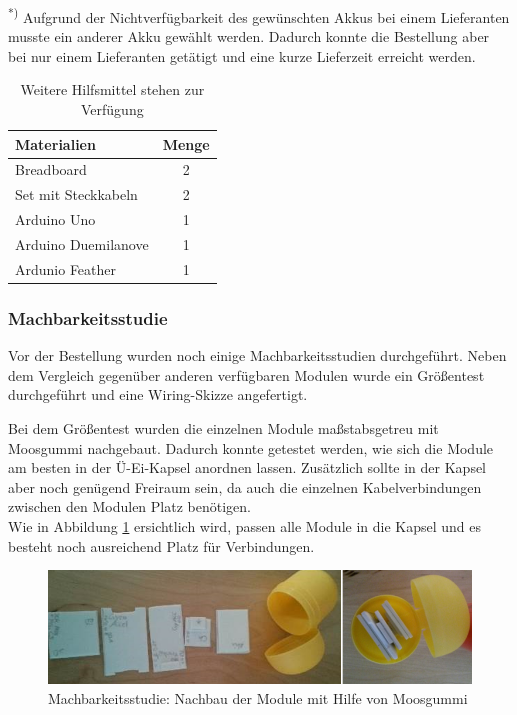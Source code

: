 \textsuperscript{*)} Aufgrund der Nichtverfügbarkeit des gewünschten Akkus bei einem Lieferanten musste ein anderer Akku gewählt werden. Dadurch konnte die Bestellung aber bei nur einem Lieferanten getätigt und eine kurze Lieferzeit erreicht werden.

\begin{table}[h]
	\centering
	\begin{tabular}{|l|c|}
		\hline
		\textbf{Materialien} & \textbf{Menge} \\
		\hline
		Breadboard & 2 \\
		\hline
		Set mit Steckkabeln & 2 \\
		\hline
		Arduino Uno & 1 \\
		\hline	
		Arduino Duemilanove & 1 \\
		\hline	
		Ardunio Feather & 1\\
		\hline
	\end{tabular}
	\caption{Weitere Hilfsmittel stehen zur Verfügung}
	\label{tab:verfuegbareHW}
\end{table}

\subsubsection{Machbarkeitsstudie}

Vor der Bestellung wurden noch einige Machbarkeitsstudien durchgeführt. Neben dem Vergleich gegenüber anderen verfügbaren Modulen wurde ein Größentest durchgeführt und eine Wiring-Skizze angefertigt.

Bei dem Größentest wurden die einzelnen Module maßstabsgetreu mit Moosgummi nachgebaut. Dadurch konnte getestet werden, wie sich die Module am besten in der Ü-Ei-Kapsel anordnen lassen. Zusätzlich sollte in der Kapsel aber noch genügend Freiraum sein, da auch die einzelnen Kabelverbindungen zwischen den Modulen Platz benötigen.  \\
Wie in Abbildung \ref{fig:k3_machbarkeitsstudie} ersichtlich wird, passen alle Module in die Kapsel und es besteht noch ausreichend Platz für Verbindungen.

\begin{figure}[ht]
	\centering
	\includegraphics[width=1\textwidth]{images/k3-machbarkeitsstudie.PNG}
	\caption {Machbarkeitsstudie: Nachbau der Module mit Hilfe von Moosgummi}
	\label{fig:k3_machbarkeitsstudie}
\end{figure}

